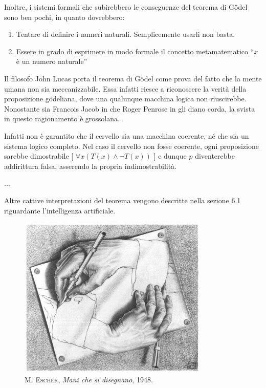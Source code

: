 \documentclass[a4paper,10pt]{article}
\begin{document}
Inoltre, i sistemi formali che subirebbero le conseguenze del teorema di Gödel sono ben pochi, in quanto dovrebbero: \cite{wp-teo-godel-it}
\begin{enumerate}
 \item Tentare di definire i numeri naturali. Semplicemente usarli non basta.
 \item Essere in grado di esprimere in modo formale il concetto metamatematico \textquotedblleft$x$ è un numero naturale\textquotedblright
\end{enumerate}

Il filosofo John Lucas porta il teorema di Gödel come prova del fatto che la mente umana non sia meccanizzabile. Essa infatti riesce a riconoscere la verità della proposizione gödeliana, dove una qualunque macchina logica non riuscirebbe. Nonostante sia Francois Jacob in \cite{jacob71} che Roger Penrose in \cite{penrose91} gli diano corda, la svista in questo ragionamento è grossolana.

Infatti non è garantito che il cervello sia una macchina coerente, né che sia un sistema logico completo. Nel caso il cervello non fosse coerente, ogni proposizione sarebbe dimostrabile [ $\forall x (T(x)\wedge\neg T(x))$ ] e dunque $p$ diventerebbe addirittura falsa, asserendo la propria indimostrabilità.

...

Altre cattive interpretazioni del teorema vengono descritte nella sezione 6.1 riguardante l'intelligenza artificiale.

\begin{figure}[t!]
 \centering
 \includegraphics[width=343]{./pics/drawing_hands.jpg}
 \caption{\textsc{M. Escher}, \textit{Mani che si disegnano}, 1948.}
\end{figure}
\end{document}

